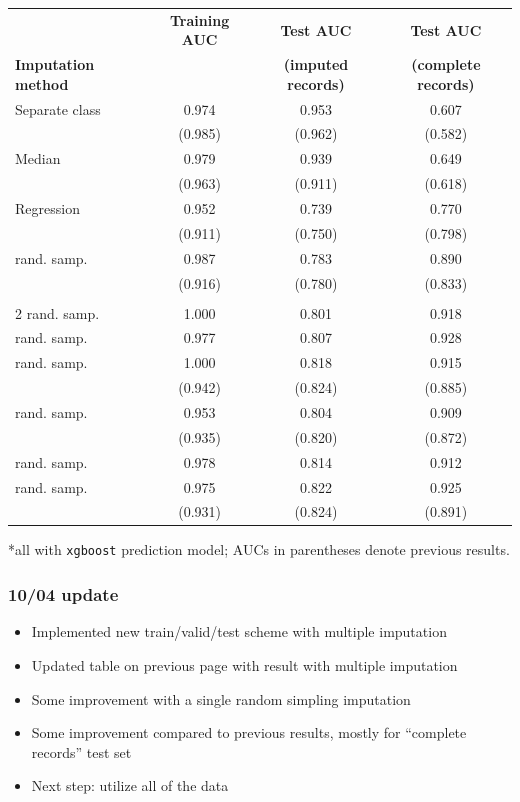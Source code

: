 \documentclass[12pt]{article}
\begin{document}
\begin{table}[ht]
\centering
\begin{tabular}{lccc}
  \toprule
 & \textbf{Training AUC} & \textbf{Test AUC} & \textbf{Test AUC} \\
\textbf{Imputation method}& & \textbf{(imputed records)} & \textbf{(complete records)} \\
  \midrule
Separate class & 0.974 & 0.953 & 0.607 \\ 
 & (0.985) & (0.962) & (0.582) \\ \addlinespace
Median & 0.979 & 0.939 & 0.649 \\
   & (0.963) & (0.911) & (0.618) \\ \addlinespace
Regression & 0.952 & 0.739 & 0.770 \\ 
   & (0.911) & (0.750) & (0.798) \\ \addlinespace
1 rand. samp. & 0.987 & 0.783 & 0.890 \\
   & (0.916) & (0.780) & (0.833) \\  \addlinespace
   \midrule
   \multicolumn{4}{c}{10/04 update} \\
   \midrule
2 rand. samp. & 1.000 & 0.801 & 0.918 \\  \addlinespace
5 rand. samp. & 0.977 & 0.807 & 0.928 \\  \addlinespace
10 rand. samp. & 1.000 & 0.818 & 0.915 \\ 
   & (0.942) & (0.824) & (0.885) \\ \addlinespace
20 rand. samp. & 0.953 & 0.804 & 0.909 \\ 
   & (0.935) & (0.820) & (0.872) \\ \addlinespace
50 rand. samp. & 0.978 & 0.814 & 0.912 \\ \addlinespace
100 rand. samp. &  0.975 & 0.822 & 0.925 \\ 
   & (0.931) & (0.824) & (0.891) \\ 
   \bottomrule
\end{tabular}
   *all with \texttt{xgboost} prediction model; AUCs in parentheses 
   denote previous results.
\end{table}




\pagebreak
\subsubsection*{10/04 update}

\begin{itemize}
	\item Implemented new train/valid/test scheme with multiple imputation
	\item Updated table on previous page with result with multiple imputation
	\item Some improvement with a single random simpling imputation
	\item Some improvement compared to previous results, mostly for ``complete records'' test set
	\item Next step: utilize all of the data
\end{itemize}
\end{document}
